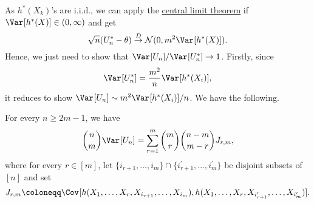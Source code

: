 As \(h^{\ast} (X_k)\)'s are i.i.d., we can apply the \hyperref[thm:CLT]{central limit theorem} if \(\Var_{}[h^{\ast} (X)] \in (0, \infty )\) and get
\[
	\sqrt{n} (U_n^{\ast} - \theta ) \overset{D}{\to} \mathcal{N} (0, m^2 \Var_{}[h^{\ast} (X)] ).
\]
Hence, we just need to show that \(\Var_{}[U_n] / \Var_{}[U_n^{\ast} ] \to 1\). Firstly, since
\[
	\Var_{}[U_n^{\ast} ]
	= \frac{m^2}{n} \Var_{}[h^{\ast} (X_i)],
\]
it reduces to show \(\Var_{}[U_n] \sim m^2 \Var_{}[h^{\ast} (X_i)] / n\). We have the following.

\begin{proposition}\label{prop:U-statistic-variance}
	For every \(n \geq 2m - 1\), we have
	\[
		\binom{n}{m} \Var_{}[U_n]
		= \sum_{r=1}^{m} \binom{m}{r} \binom{n-m}{m-r}J_{r, m},
	\]
	where for every \(r \in [m]\), let \(\{ i_{r+1} , \dots , i_m\} \cap \{ i_{r+1}^{\prime} , \dots , i_m^{\prime} \} \) be disjoint subsets of \([n]\) and set
	\[
		J_{r, m} \coloneqq \Cov_{}[h(X_1, \dots , X_r, X_{i_{r+1}}, \dots , X_{i_m}), h(X_1, \dots , X_r, X_{i^{\prime} _{r+1}}, \dots , X_{i_m^{\prime} })].
	\]
\end{proposition}
